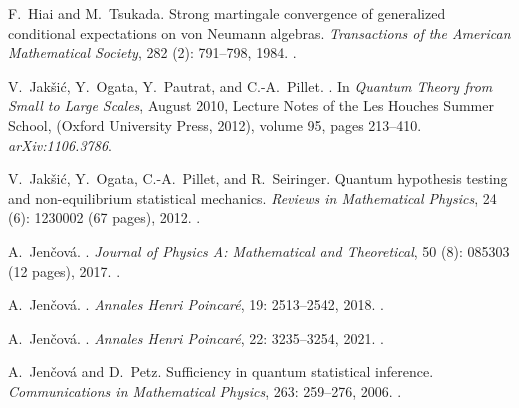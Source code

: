 \documentclass[12pt]{article}
\theoremstyle{definition}
\theoremstyle{remark}
\numberwithin{equation}{section}
\begin{document}
\begin{thebibliography}{27}
F.~Hiai and M.~Tsukada.
\newblock Strong martingale convergence of generalized conditional expectations
  on von {N}eumann algebras.
\newblock \emph{Transactions of the American Mathematical Society},
  282 (2): 791--798, 1984.
\newblock {}.

V.~Jak{\v{s}}i{\'c}, Y.~Ogata, Y.~Pautrat, and C.-A.~Pillet.
.
\newblock In \emph{Quantum Theory from Small to Large Scales}, August 2010,
Lecture Notes of the Les Houches Summer School,  (Oxford University Press, 2012),
volume 95, pages 213--410.
\newblock \emph{arXiv:1106.3786}.

V.~Jak{\v s}i{\'c}, Y.~Ogata, C.-A.~Pillet, and R.~Seiringer.
\newblock Quantum hypothesis testing and non-equilibrium statistical mechanics.
\newblock \emph{Reviews in Mathematical Physics}, 24 (6):
1230002 (67 pages), 2012.
\newblock {}.

A.~Jen{\v{c}}ov{\'a}.
.
\newblock \emph{Journal of Physics A: Mathematical and Theoretical}, 50
(8): 085303 (12 pages), 2017.
\newblock {}.

A.~Jen{\v c}ov{\'a}.
.
\newblock \emph{Annales Henri Poincar{\'e}}, 19: 2513--2542, 2018.
\newblock {}.

A.~Jen{\v{c}}ov{\'a}.
.
\newblock \emph{Annales Henri Poincar{\'e}}, 22: 3235–3254, 2021.
\newblock {}.

A.~Jen{\v c}ov{\'a} and D.~Petz.
\newblock Sufficiency in quantum statistical inference.
\newblock \emph{Communications in Mathematical Physics}, 263:
259--276, 2006.
\newblock {}.


\end{thebibliography}
\end{document}
